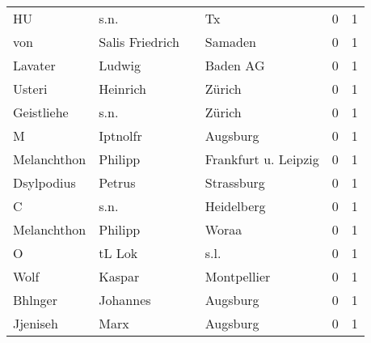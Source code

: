 \documentclass[10pt,a4paper,landscape]{article}
\begin{document}
\begin{longtable}{llllrr}
                       HU &                               s.n. &             &                                          Tx &          0 &         1 \\
                      von &                    Salis Friedrich &             &                                     Samaden &          0 &         1 \\
                  Lavater &                             Ludwig &             &                                    Baden AG &          0 &         1 \\
                   Usteri &                           Heinrich &             &                                      Zürich &          0 &         1 \\
               Geistliehe &                               s.n. &             &                                      Zürich &          0 &         1 \\
                        M &                           Iptnolfr &             &                                    Augsburg &          0 &         1 \\
              Melanchthon &                            Philipp &             &                        Frankfurt u. Leipzig &          0 &         1 \\
               Dsylpodius &                             Petrus &             &                                  Strassburg &          0 &         1 \\
                        C &                               s.n. &             &                                  Heidelberg &          0 &         1 \\
              Melanchthon &                            Philipp &             &                                       Woraa &          0 &         1 \\
                        O &                             tL Lok &             &                                        s.l. &          0 &         1 \\
                     Wolf &                             Kaspar &             &                                 Montpellier &          0 &         1 \\
                  Bhlnger &                           Johannes &             &                                    Augsburg &          0 &         1 \\
                 Jjeniseh &                               Marx &             &                                    Augsburg &          0 &         1 \\

\end{longtable}
\end{document}
